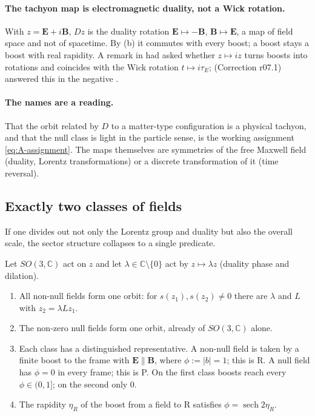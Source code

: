 \paragraph{The tachyon map is electromagnetic duality, not a Wick rotation.}
With $z=\mathbf E+i\mathbf B$, $Dz$ is the duality rotation $\mathbf E\mapsto-\mathbf B$,
$\mathbf B\mapsto\mathbf E$, a map of field space and not of spacetime. By (b) it commutes with every
boost; a boost stays a boost with real rapidity. A remark in  had asked whether $z\mapsto iz$
turns boosts into rotations and coincides with the Wick rotation $t\mapsto i\tau_E$;  (Correction
r07.1) answered this in the negative \Established.

\paragraph{The names are a reading.}
That the orbit related by $D$ to a matter-type configuration is a physical tachyon, and that the null
class is light in the particle sense, is the working assignment \eqref{eq:A-assignment}. The maps
themselves are symmetries of the free Maxwell field (duality, Lorentz transformations) or a discrete
transformation of it (time reversal).



\subsection{Exactly two classes of fields}
\label{sec:A-classes}

If one divides out not only the Lorentz group and duality but also the overall scale, the sector
structure collapses to a single predicate.

\begin{proposition}
\label{prop:A-classes}
Let $SO(3,\mathbb C)$ act on $z$ and let $\lambda\in\mathbb C\setminus\{0\}$ act by $z\mapsto\lambda z$ (duality
phase and dilation).
\begin{enumerate}
\item[(a)] All non-null fields form one orbit: for $s(z_1),s(z_2)\neq0$ there are $\lambda$ and $L$ with
  $z_2=\lambda Lz_1$.
\item[(b)] The non-zero null fields form one orbit, already of $SO(3,\mathbb C)$ alone.
\item[(c)] Each class has a distinguished representative. A non-null field is taken by a finite boost to
  the frame with $\mathbf E\parallel\mathbf B$, where $\phi:=|b|=1$; this is R. A null field has $\phi=0$ in
  every frame; this is P. On the first class boosts reach every $\phi\in(0,1]$; on the second only $0$.
\item[(d)] The rapidity $\eta_R$ of the boost from a field to R satisfies $\phi=\operatorname{sech}2\eta_R$.
\end{enumerate}
\end{proposition}

